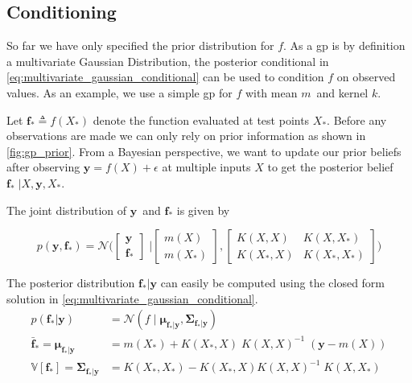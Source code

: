 \subsection{Conditioning}
So far we have only specified the prior distribution for $f$. As a \acrshort{gp} is by definition a multivariate Gaussian Distribution, the posterior conditional in \cref{eq:multivariate_gaussian_conditional} can be used to condition $f$ on observed values. 
As an example, we use a simple \acrshort{gp} for $f$ with mean $m$ and kernel $k$.

Let $\boldsymbol{f}_* \triangleq f(X_*)$ denote the function evaluated at test points $X_*$. Before any observations are made we can only rely on prior information as shown in \cref{fig:gp_prior}. From a Bayesian perspective, we want to update our prior beliefs after observing $\boldsymbol{y} = f(X) + \epsilon$ at multiple inputs $X$ to get the posterior belief $\boldsymbol{f}_* \; | X, \boldsymbol{y}, X_*$.

The joint distribution of $\boldsymbol{y}$ and $\boldsymbol{f}_*$ is given by 

\begin{equation}
    p(\boldsymbol{y}, \boldsymbol{f}_*) = \mathcal{N}\bigg(\begin{bmatrix}
        \boldsymbol{y} \\ \boldsymbol{f}_*
    \end{bmatrix} \; \bigg| \begin{bmatrix}
        m(X) \\ m(X_*)
    \end{bmatrix},  \begin{bmatrix}
        K(X, X) & K(X, X_*) \\ K(X_*, X) & K(X_*, X_*)
    \end{bmatrix}\bigg)
\end{equation}

The posterior distribution $\boldsymbol{f}_* | \boldsymbol{y}$ can easily be computed using the closed form solution in \cref{eq:multivariate_gaussian_conditional}.
\begin{subequations}\label{eq:gp_conditional}
\begin{align}
    p(\boldsymbol{f}_* | \boldsymbol{y}) &= \mathcal{N}(f \; | \; \boldsymbol{\mu}_{\boldsymbol{f}_*|\boldsymbol{y}}, \boldsymbol{\Sigma}_{\boldsymbol{f}_*|\boldsymbol{y}})\\
    \bar{\boldsymbol{f}}_* = \boldsymbol{\mu}_{\boldsymbol{f}_* | \boldsymbol{y}} &= m(X_*) + K(X_*, X) \; K(X, X)^{-1} \; (\boldsymbol{y} - m(X))\label{eq:gp_conditional_mean}\\
    \mathbb{V}[\boldsymbol{f}_*] = \boldsymbol{\Sigma}_{\boldsymbol{f}_* | \boldsymbol{y}} &= K(X_*, X_*) - K(X_*, X)  K(X, X)^{-1} \; K(X, X_*)\label{eq:gp_conditional_var}
\end{align}
\end{subequations}

